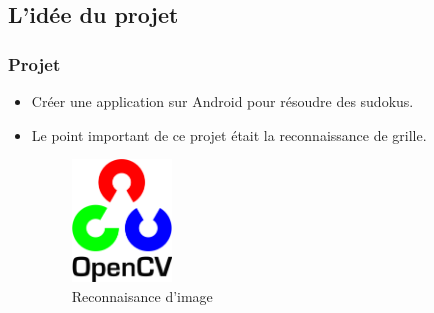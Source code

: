 \documentclass{beamer}
\begin{document}
\begin{frame}

\subsection{L'idée du projet}
\frametitle{Projet}
\begin{itemize}
    \item Créer une application sur Android pour résoudre des sudokus.
    \item Le point important de ce projet était la reconnaissance de grille.

     \begin{figure}[htbp]
        \includegraphics[width=100]{img/open.png}
        \caption{Reconnaisance d'image}
        \label{fig:my_label}
    \end{figure}
    
\end{itemize}
\end{frame}
\end{document}

